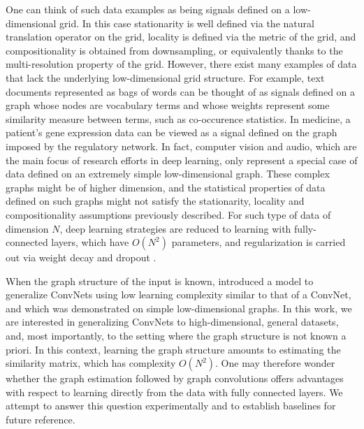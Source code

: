\documentclass{article} %
\begin{document}
%
%
% 
One can think of such data examples as being signals defined on a low-dimensional grid. In this case stationarity is well defined via the natural translation 
operator on the grid, locality is defined via the metric of the grid, and compositionality is obtained from downsampling, or equivalently thanks to the multi-resolution property of the grid.
However, there exist many examples of data that lack the underlying low-dimensional grid structure. 
For example, text documents represented as bags of words can be thought of as signals defined on a graph whose nodes are vocabulary terms and whose weights represent some similarity measure between terms, such as co-occurence statistics. In medicine, a patient's gene expression data can be viewed as a signal defined on the graph imposed by the regulatory network. In fact, computer vision and audio, which are the main focus of research efforts in deep learning, only represent a special case of data defined on an extremely simple low-dimensional graph. These complex graphs might be of higher dimension, and the statistical properties of data defined on such graphs might not satisfy the stationarity, locality and compositionality assumptions previously described.
For such type of data of dimension $N$, deep learning strategies are reduced to learning with fully-connected layers, which have $O(N^2)$ parameters, and regularization is carried out via weight decay and dropout \cite{srivastava2014dropout}.

When the graph structure of the input is known, \cite{spectralnet2013} introduced a model to generalize ConvNets using low learning complexity similar to that of a ConvNet, and which was demonstrated on simple low-dimensional graphs. In this work, we are interested in generalizing ConvNets to high-dimensional, general datasets,  and, most importantly, to the setting where the graph structure is not known a priori. In this context, learning the graph structure amounts to estimating the similarity matrix, which has complexity $O(N^2)$. One may therefore wonder whether the graph estimation followed by graph convolutions offers advantages with respect to learning directly from the data with fully connected layers. We attempt to answer this question experimentally and to establish baselines for future reference. 
 
\end{document}
